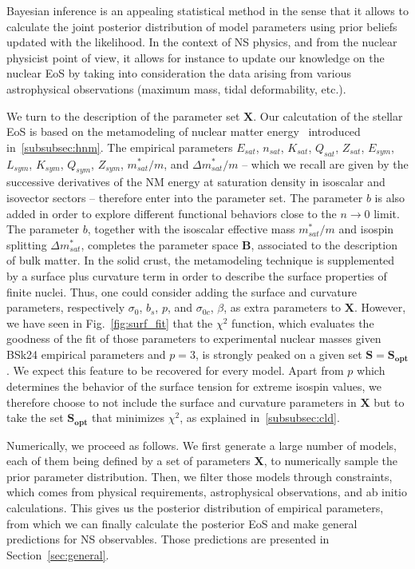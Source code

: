 Bayesian inference is an appealing statistical method in the sense that it 
allows to calculate the joint posterior distribution of model parameters using 
prior beliefs updated with the likelihood. In the context of NS physics, and 
from the nuclear physicist point of view, it allows for instance to update our 
knowledge on the nuclear EoS by taking into consideration the data arising from 
various astrophysical observations (maximum mass, tidal deformability, etc.).

We turn to the description of the parameter set $\bm{X}$. Our calcutation
of the stellar EoS is based on the metamodeling of nuclear matter
energy~\cite{Margueron2018a} introduced in~\ref{subsubsec:hnm}. The empirical
parameters $E_{sat}$, $n_{sat}$, $K_{sat}$, $Q_{sat}$, $Z_{sat}$, $E_{sym}$,
$L_{sym}$, $K_{sym}$, $Q_{sym}$, $Z_{sym}$, $m_{sat}^*/m$, and $\Delta
m_{sat}^*/m$ -- which we recall are given by the successive derivatives of the 
NM energy at saturation density in isoscalar and isovector sectors -- therefore 
enter into the parameter set. The parameter $b$ is also added in order 
to explore different functional behaviors close to the $n\rightarrow 0$ limit.
The parameter $b$, together with the isoscalar effective mass $m_{sat}^*/m$ and 
isospin splitting $\Delta m_{sat}^*$, completes the parameter space $\bm{B}$, 
associated to the description of bulk matter.
In the solid crust, the metamodeling technique is supplemented by a surface 
plus curvature term in order to describe the surface properties of finite 
nuclei. Thus, one could consider adding the surface and curvature parameters, 
respectively $\sigma_0$, $b_s$, $p$, and $\sigma_{0c}$, $\beta$, as extra
parameters to $\bm{X}$. However, we have
seen in Fig.~\ref{fig:surf_fit} that the $\chi^2$ function, which evaluates the 
goodness of the fit of those parameters to experimental nuclear masses given 
BSk24 empirical parameters and $p=3$, is strongly peaked on a given set
$\bm{S}=\bm{S_{opt}}$. We expect this 
feature to be recovered for every model. Apart from $p$ which determines the 
behavior of the surface tension for extreme isospin values, we therefore choose 
to not include the surface and curvature parameters in $\bm{X}$ but to take the
set $\bm{S_{opt}}$ that minimizes $\chi^2$, as explained 
in~\ref{subsubsec:cld}.

Numerically, we proceed as follows. We first generate a large number of models, 
each of them being defined by a set of parameters $\bm{X}$, to 
numerically sample the prior parameter distribution. Then, we filter those 
models through constraints, which comes from physical requirements, 
astrophysical observations, and ab initio calculations. This gives us the 
posterior distribution of empirical parameters, from which we can finally
calculate the posterior EoS and make general predictions for NS observables. 
Those predictions are presented in Section~\ref{sec:general}.

